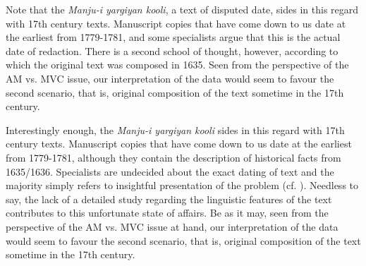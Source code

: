 \documentclass{article}
\begin{document}
Note that the \textit{Manju-i yargiyan kooli}, a text of disputed date, sides in this regard with 17th century texts. Manuscript copies that have come down to us date at the earliest from 1779-1781, and some specialists argue that this is the actual date of redaction. There is a second school of thought, however, according to which the original text was composed in 1635. Seen from the perspective of the AM vs. MVC issue, our interpretation of the data would seem to favour the second scenario, that is, original composition of the text sometime in the 17th century.
 
 Interestingly enough, the \textit{Manju-i yargiyan kooli} sides in this regard with 17th century texts. Manuscript copies that have come down to us date at the earliest from 1779-1781, although they contain the description of historical facts from 1635/1636. Specialists are undecided about the exact dating of text and the majority simply refers to \citet[59-71, esp. 62-64]{fuchs36manchu} insightful presentation of the problem (cf. \citealt[19-21]{shunjuu92yargiyan}). Needless to say, the lack of a detailed study regarding the linguistic features of the text contributes to this unfortunate state of affairs. Be as it may, seen from the perspective of the AM vs. MVC issue at hand, our interpretation of the data would seem to favour the second scenario, that is, original composition of the text sometime in the 17th century.
  
\end{document}

